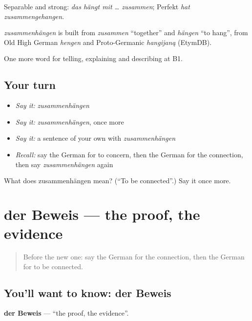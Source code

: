 Separable and strong: \emph{das hängt mit … zusammen}; Perfekt \emph{hat zusammengehangen}.

\begin{cousinweb}
\emph{zusammenhängen} is built from \emph{zusammen} \textquotedblleft{}together\textquotedblright{} and \emph{hängen} \textquotedblleft{}to hang\textquotedblright{}, from Old High German \emph{hengen} and Proto-Germanic \emph{hangijaną} (EtymDB).
\end{cousinweb}

\begin{grammarlens}[title={What you've built}]
One more word for telling, explaining and describing at B1.
\end{grammarlens}

\subsection*{Your turn}
\begin{itemize}
\raggedright
  \item \emph{Say it:} \emph{zusammenhängen}
  \item \emph{Say it:} \emph{zusammenhängen}, once more
  \item \emph{Say it:} a sentence of your own with \emph{zusammenhängen}
  \item \emph{Recall:} say the German for to concern, then the German for the connection, then say \emph{zusammenhängen} again
\end{itemize}

\begin{tcolorbox}[breakable,colback=teal!4,colframe=teal!35!black,title={Before you move on}]
What does zusammenhängen mean? (\textquotedblleft{}To be connected\textquotedblright{}.) Say it once more.
\end{tcolorbox}
\section[der Beweis]{der Beweis — the proof, the evidence}

\label{lesson:GE-C345-beweis}



\begin{quote}
Before the new one: say the German for the connection, then the German for to be connected.
\end{quote}

\subsection*{You'll want to know: der Beweis}
\textbf{der Beweis} — \textquotedblleft{}the proof, the evidence\textquotedblright{}.

